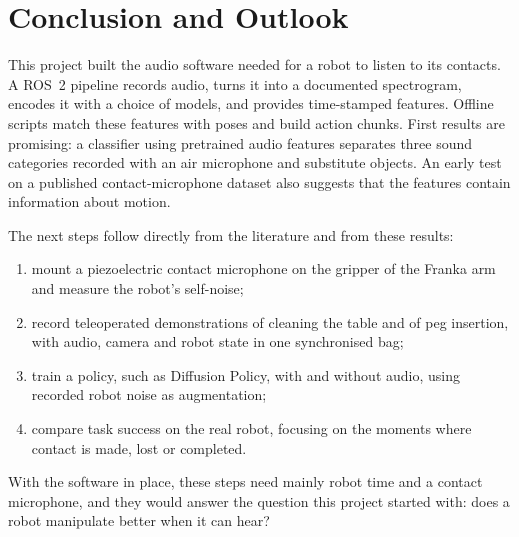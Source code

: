 \documentclass[
  english,
  accentcolor=11b,
  type=intern,
  marginpar=false,
  logofile=figures/PEARLTUDA.png
]{tudapub}
\begin{document}
\section{Conclusion and Outlook}
\label{sec:conclusion}

This project built the audio software needed for a robot to listen to its contacts. A ROS~2 pipeline records audio, turns it into a documented spectrogram, encodes it with a choice of models, and provides time-stamped features. Offline scripts match these features with poses and build action chunks. First results are promising: a classifier using pretrained audio features separates three sound categories recorded with an air microphone and substitute objects. An early test on a published contact-microphone dataset also suggests that the features contain information about motion.

The next steps follow directly from the literature and from these results:

\begin{enumerate}[leftmargin=*]
  \item mount a piezoelectric contact microphone on the gripper of the Franka arm and measure the robot's self-noise;
  \item record teleoperated demonstrations of cleaning the table and of peg insertion, with audio, camera and robot state in one synchronised bag;
  \item train a policy, such as Diffusion Policy, with and without audio, using recorded robot noise as augmentation;
  \item compare task success on the real robot, focusing on the moments where contact is made, lost or completed.
\end{enumerate}

With the software in place, these steps need mainly robot time and a contact microphone, and they would answer the question this project started with: does a robot manipulate better when it can hear?



\end{document}
